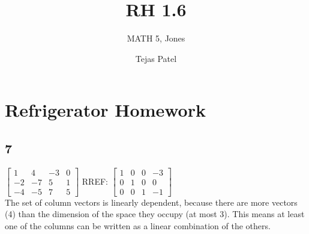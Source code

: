 \documentclass{article}
\title{RH 1.6}
\author{MATH 5, Jones}
\date{Tejas Patel}
\begin{document}
\maketitle
\section*{Refrigerator Homework}
\subsection*{7}

$\begin{bmatrix} 1 & 4 & -3 & 0 \\ -2 & -7 & 5 & 1 \\ -4 & -5 & 7 & 5 \end{bmatrix}$ RREF: 
$\begin{bmatrix}
    1 & 0 & 0 & -3 \\
    0 & 1 & 0 & 0 \\
    0 & 0 & 1 & -1
    \end{bmatrix}$
\\The set of column vectors is linearly dependent, because there are more vectors (4) than the dimension of the space they occupy (at most 3). This means at least one of the columns can be written as a linear combination of the others.
\end{document}
